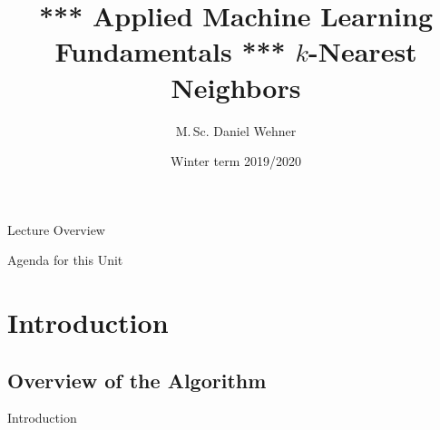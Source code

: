 


\title[$k$-Nearest Neighbors]{*** Applied Machine Learning Fundamentals *** $k$-Nearest Neighbors}
\author{M.\,Sc. Daniel Wehner}
\date{Winter term 2019/2020}




\maketitlepage


\begin{frame}{Lecture Overview}{}
\end{frame}


\begin{frame}{Agenda for this Unit}
	\begin{multicols}{2}
		\tableofcontents
	\end{multicols}
\end{frame}


\section{Introduction}

\subsection{Overview of the Algorithm}

\begin{frame}{Introduction}{}
\end{frame}


